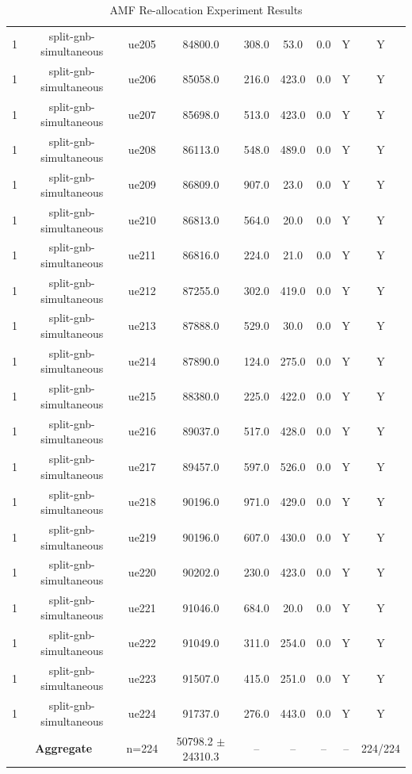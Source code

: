 \begin{table}[ht]
\begin{tabular}{|c|c|c|c|c|c|c|c|c|}
1 & split-gnb-simultaneous & ue205 & 84800.0 & 308.0 & 53.0 & 0.0 & Y & Y \\
1 & split-gnb-simultaneous & ue206 & 85058.0 & 216.0 & 423.0 & 0.0 & Y & Y \\
1 & split-gnb-simultaneous & ue207 & 85698.0 & 513.0 & 423.0 & 0.0 & Y & Y \\
1 & split-gnb-simultaneous & ue208 & 86113.0 & 548.0 & 489.0 & 0.0 & Y & Y \\
1 & split-gnb-simultaneous & ue209 & 86809.0 & 907.0 & 23.0 & 0.0 & Y & Y \\
1 & split-gnb-simultaneous & ue210 & 86813.0 & 564.0 & 20.0 & 0.0 & Y & Y \\
1 & split-gnb-simultaneous & ue211 & 86816.0 & 224.0 & 21.0 & 0.0 & Y & Y \\
1 & split-gnb-simultaneous & ue212 & 87255.0 & 302.0 & 419.0 & 0.0 & Y & Y \\
1 & split-gnb-simultaneous & ue213 & 87888.0 & 529.0 & 30.0 & 0.0 & Y & Y \\
1 & split-gnb-simultaneous & ue214 & 87890.0 & 124.0 & 275.0 & 0.0 & Y & Y \\
1 & split-gnb-simultaneous & ue215 & 88380.0 & 225.0 & 422.0 & 0.0 & Y & Y \\
1 & split-gnb-simultaneous & ue216 & 89037.0 & 517.0 & 428.0 & 0.0 & Y & Y \\
1 & split-gnb-simultaneous & ue217 & 89457.0 & 597.0 & 526.0 & 0.0 & Y & Y \\
1 & split-gnb-simultaneous & ue218 & 90196.0 & 971.0 & 429.0 & 0.0 & Y & Y \\
1 & split-gnb-simultaneous & ue219 & 90196.0 & 607.0 & 430.0 & 0.0 & Y & Y \\
1 & split-gnb-simultaneous & ue220 & 90202.0 & 230.0 & 423.0 & 0.0 & Y & Y \\
1 & split-gnb-simultaneous & ue221 & 91046.0 & 684.0 & 20.0 & 0.0 & Y & Y \\
1 & split-gnb-simultaneous & ue222 & 91049.0 & 311.0 & 254.0 & 0.0 & Y & Y \\
1 & split-gnb-simultaneous & ue223 & 91507.0 & 415.0 & 251.0 & 0.0 & Y & Y \\
1 & split-gnb-simultaneous & ue224 & 91737.0 & 276.0 & 443.0 & 0.0 & Y & Y \\
\multicolumn{2}{|c|}{\textbf{Aggregate}} & n=224 & 50798.2 $\pm$ 24310.3 & -- & -- & -- & -- & 224/224 \\
\hline
\end{tabular}
\caption{AMF Re-allocation Experiment Results}
\label{tab:amf_realloc}
\end{table}
